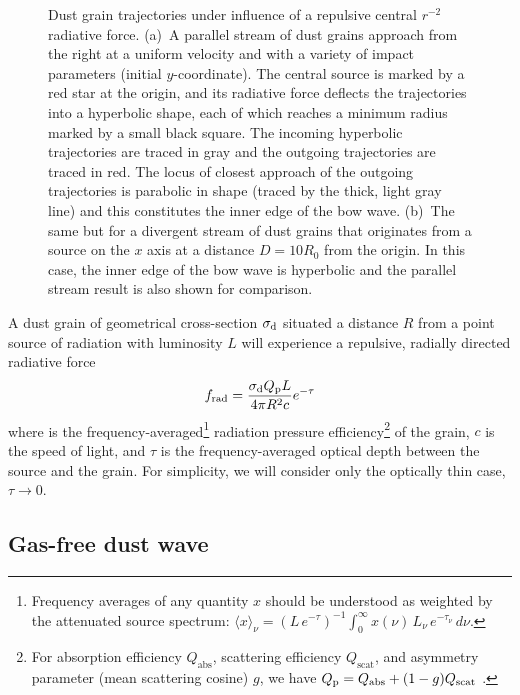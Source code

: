 \begin{figure}
  \caption[Dust grain trajectories]{Dust grain trajectories under
    influence of a repulsive central \(r^{-2}\) radiative force.
    (a)~A parallel stream of dust grains approach from the right at a
    uniform velocity and with a variety of impact parameters (initial
    \(y\)-coordinate). The central source is marked by a red star at
    the origin, and its radiative force deflects the trajectories into
    a hyperbolic shape, each of which reaches a minimum radius marked
    by a small black square.  The incoming hyperbolic trajectories are
    traced in gray and the outgoing trajectories are traced in red.
    The locus of closest approach of the outgoing trajectories is
    parabolic in shape (traced by the thick, light gray line) and this
    constitutes the inner edge of the bow wave.  (b)~The same but for
    a divergent stream of dust grains that originates from a source on
    the \(x\) axis at a distance \(D = 10 R_0\) from the origin.  In
    this case, the inner edge of the bow wave is hyperbolic and the
    parallel stream result is also shown for comparison.}
  \label{fig:dust-trajectories}
\end{figure}



A dust grain of geometrical cross-section \(\sigma_{\text{d}}\) situated a
distance \(R\) from a point source of radiation with luminosity \(L\)
will experience a repulsive, radially directed radiative force
\citep[e.g.,][]{Spitzer:1978a}
\begin{equation}
  \label{eq:dust-rad-force}
  f_{\text{rad}} = \frac{\sigma_{\text{d}} Q_{\text{p}} L} {4 \pi R^2 c} e^{-\tau}
\end{equation}
where \Qp{} is the frequency-averaged\footnote{%
  Frequency averages of any quantity \(x\) should be understood as
  weighted by the attenuated source spectrum:
  \(\langle x \rangle_\nu = (L \, e^{-\tau})^{-1} \int_0^\infty x(\nu)\, L_\nu \, e^{-\tau_\nu} \, d\nu
  \).  } %
radiation pressure efficiency\footnote{%
  For absorption efficiency \(Q_{\text{abs}}\), scattering efficiency
  \(Q_{\text{scat}}\), and asymmetry parameter (mean scattering
  cosine) \(g\), we have
  \(Q_{\text{p}} = Q_{\text{abs}} + (1 - g) Q_{\text{scat}}\)
  \citep[e.g., \S~4.5 of][]{Bohren:1983a}.} %
of the grain, \(c\) is the speed of light, and \(\tau\) is the
frequency-averaged optical depth between the source and the grain.
For simplicity, we will consider only the optically thin case,
\(\tau \to 0\).

\subsection{Gas-free dust wave}
\label{sec:gas-free-bow}



